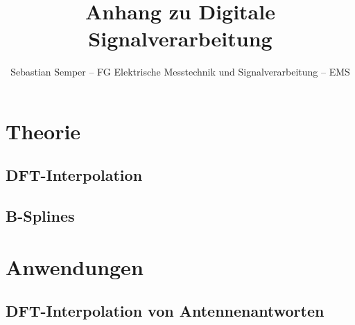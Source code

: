 \documentclass[ngerman]{article}
\title{Anhang zu Digitale Signalverarbeitung}
\author{Sebastian Semper -- FG Elektrische Messtechnik und Signalverarbeitung -- EMS}
\begin{document}

%
%
\section{Theorie}
%
%
\subsection{DFT-Interpolation}\label{dftintp}
%

%
%
\subsection{B-Splines}\label{bsplines}
%

%
%
\section{Anwendungen}
%
%
\subsection{DFT-Interpolation von Antennenantworten}\label{eadf}
%

%
%
%

\end{document}
